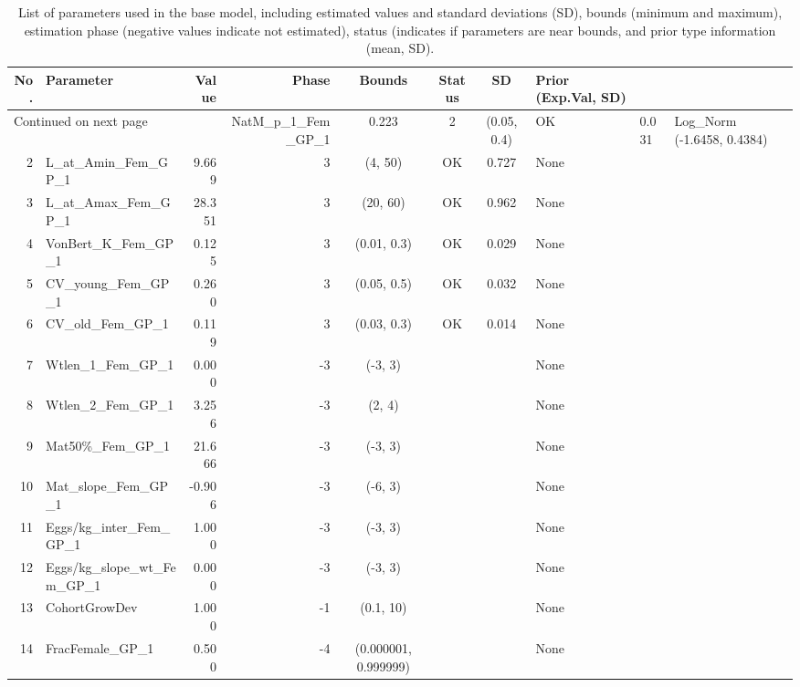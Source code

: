 \documentclass[12pt,]{article}
\begin{document}
\begin{landscape}
\begin{longtable}{rlrrcccp{1.5in}}
\caption{List of parameters used in
                                              the base model, including estimated 
                                              values and standard deviations (SD), 
                                              bounds (minimum and maximum), 
                                              estimation phase (negative values indicate
                                              not estimated), status (indicates if 
                                              parameters are near bounds, and prior type
                                              information (mean, SD).} \\ 
  \hline
No. & Parameter & Value & Phase & Bounds & Status & SD & Prior (Exp.Val, SD)  \\ 
  \hline 
\endhead 
\hline 
\multicolumn{3}{l}{\footnotesize Continued on next page} 
\endfoot 
\endlastfoot 
 \hline
1 & NatM\_p\_1\_Fem\_GP\_1 & 0.223 & 2 & (0.05, 0.4) & OK & 0.031 & Log\_Norm (-1.6458, 0.4384) \\ 
  2 & L\_at\_Amin\_Fem\_GP\_1 & 9.669 & 3 & (4, 50) & OK & 0.727 & None \\ 
  3 & L\_at\_Amax\_Fem\_GP\_1 & 28.351 & 3 & (20, 60) & OK & 0.962 & None \\ 
  4 & VonBert\_K\_Fem\_GP\_1 & 0.125 & 3 & (0.01, 0.3) & OK & 0.029 & None \\ 
  5 & CV\_young\_Fem\_GP\_1 & 0.260 & 3 & (0.05, 0.5) & OK & 0.032 & None \\ 
  6 & CV\_old\_Fem\_GP\_1 & 0.119 & 3 & (0.03, 0.3) & OK & 0.014 & None \\ 
  7 & Wtlen\_1\_Fem\_GP\_1 & 0.000 & -3 & (-3, 3) &  &  & None \\ 
  8 & Wtlen\_2\_Fem\_GP\_1 & 3.256 & -3 & (2, 4) &  &  & None \\ 
  9 & Mat50\%\_Fem\_GP\_1 & 21.666 & -3 & (-3, 3) &  &  & None \\ 
  10 & Mat\_slope\_Fem\_GP\_1 & -0.906 & -3 & (-6, 3) &  &  & None \\ 
  11 & Eggs/kg\_inter\_Fem\_GP\_1 & 1.000 & -3 & (-3, 3) &  &  & None \\ 
  12 & Eggs/kg\_slope\_wt\_Fem\_GP\_1 & 0.000 & -3 & (-3, 3) &  &  & None \\ 
  13 & CohortGrowDev & 1.000 & -1 & (0.1, 10) &  &  & None \\ 
  14 & FracFemale\_GP\_1 & 0.500 & -4 & (0.000001, 0.999999) &  &  & None \\ 

\end{longtable}
\end{landscape}
\end{document}
